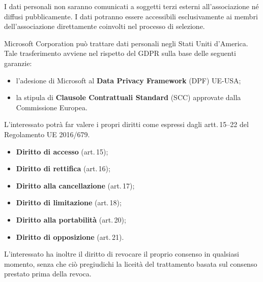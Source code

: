 \documentclass[legal]{core/polinetwork}
\begin{document}

I dati personali non saranno comunicati a soggetti terzi esterni
all'associazione né diffusi pubblicamente. I dati potranno essere
accessibili esclusivamente ai membri dell'associazione direttamente
coinvolti nel processo di selezione.


Microsoft Corporation può trattare dati personali negli Stati Uniti
d'America. Tale trasferimento avviene nel rispetto del GDPR sulla
base delle seguenti garanzie:

\begin{itemize}
  \item l'adesione di Microsoft al \textbf{Data Privacy Framework}
    (DPF) UE-USA;
  \item la stipula di \textbf{Clausole Contrattuali Standard} (SCC)
    approvate dalla Commissione Europea.
\end{itemize}


L'interessato potrà far valere i propri diritti come espressi dagli
artt.\,15--22 del Regolamento UE 2016/679.

\begin{itemize}
  \item \textbf{Diritto di accesso} (art.\,15);
  \item \textbf{Diritto di rettifica} (art.\,16);
  \item \textbf{Diritto alla cancellazione} (art.\,17);
  \item \textbf{Diritto di limitazione} (art.\,18);
  \item \textbf{Diritto alla portabilità} (art.\,20);
  \item \textbf{Diritto di opposizione} (art.\,21).
\end{itemize}


L'interessato ha inoltre il diritto di revocare il proprio consenso
in qualsiasi momento, senza che ciò pregiudichi la liceità del
trattamento basata sul consenso prestato prima della revoca.

\vfill
\pnContactBlock
\end{document}
